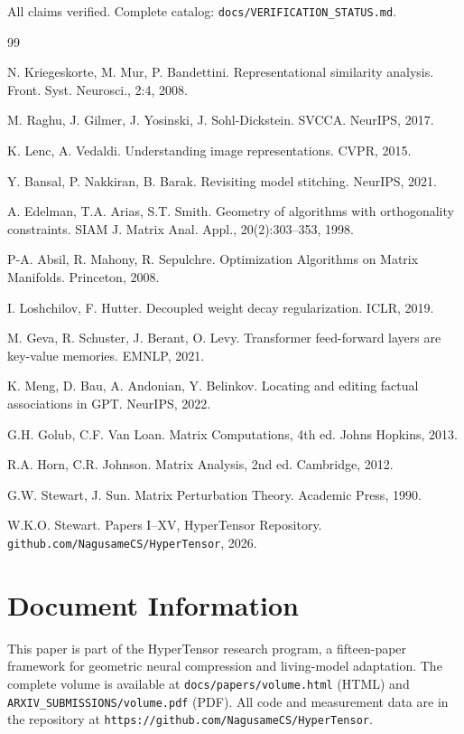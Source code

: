 \documentclass[11pt]{article}
\begin{document}
\vspace{12pt}
\noindent All claims verified. Complete catalog: \texttt{docs/VERIFICATION\_STATUS.md}.


\clearpage
\begin{thebibliography}{99}

N. Kriegeskorte, M. Mur, P. Bandettini. Representational similarity analysis. Front. Syst. Neurosci., 2:4, 2008.

M. Raghu, J. Gilmer, J. Yosinski, J. Sohl-Dickstein. SVCCA. NeurIPS, 2017.

K. Lenc, A. Vedaldi. Understanding image representations. CVPR, 2015.

Y. Bansal, P. Nakkiran, B. Barak. Revisiting model stitching. NeurIPS, 2021.

A. Edelman, T.A. Arias, S.T. Smith. Geometry of algorithms with orthogonality constraints. SIAM J. Matrix Anal. Appl., 20(2):303--353, 1998.

P-A. Absil, R. Mahony, R. Sepulchre. Optimization Algorithms on Matrix Manifolds. Princeton, 2008.

I. Loshchilov, F. Hutter. Decoupled weight decay regularization. ICLR, 2019.

M. Geva, R. Schuster, J. Berant, O. Levy. Transformer feed-forward layers are key-value memories. EMNLP, 2021.

K. Meng, D. Bau, A. Andonian, Y. Belinkov. Locating and editing factual associations in GPT. NeurIPS, 2022.

G.H. Golub, C.F. Van Loan. Matrix Computations, 4th ed. Johns Hopkins, 2013.

R.A. Horn, C.R. Johnson. Matrix Analysis, 2nd ed. Cambridge, 2012.

G.W. Stewart, J. Sun. Matrix Perturbation Theory. Academic Press, 1990.

W.K.O. Stewart. Papers I--XV, HyperTensor Repository. \texttt{github.com/NagusameCS/HyperTensor}, 2026.

\end{thebibliography}


\section*{Document Information}

This paper is part of the HyperTensor research program, a fifteen-paper framework for geometric neural compression and living-model adaptation. The complete volume is available at \texttt{docs/papers/volume.html} (HTML) and \texttt{ARXIV\_SUBMISSIONS/volume.pdf} (PDF). All code and measurement data are in the repository at \texttt{https://github.com/NagusameCS/HyperTensor}.
\end{document}
